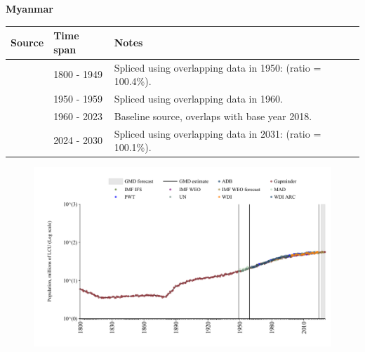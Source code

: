 \documentclass[12pt,a4paper,landscape]{article}
\begin{document}
\begin{adjustbox}{max totalsize={\paperwidth}{\paperheight},center}
\begin{minipage}[t][\textheight][t]{\textwidth}
\vspace*{0.5cm}
{}
\begin{center}
{\Large\bfseries Myanmar}
\end{center}
\vspace{0.5cm}
\begin{table}[H]
\centering
\small
\begin{tabular}{|l|l|l|}
\hline
\textbf{Source} & \textbf{Time span} & \textbf{Notes} \\
\hline
\rowcolor{white}\cite{Gapminder}& 1800 - 1949 &Spliced using overlapping data in 1950: (ratio = 100.4\%).\\
\rowcolor{lightgray}\cite{IMF_IFS}& 1950 - 1959 &Spliced using overlapping data in 1960.\\
\rowcolor{white}\cite{WDI}& 1960 - 2023 &Baseline source, overlaps with base year 2018.\\
\rowcolor{lightgray}\cite{Gapminder}& 2024 - 2030 &Spliced using overlapping data in 2031: (ratio = 100.1\%).\\
\hline
\end{tabular}
\end{table}
\begin{figure}[H]
\centering
\includegraphics[width=\textwidth,height=0.6\textheight,keepaspectratio]{graphs/MMR_pop.pdf}
\end{figure}
\end{minipage}
\end{adjustbox}
\end{document}
